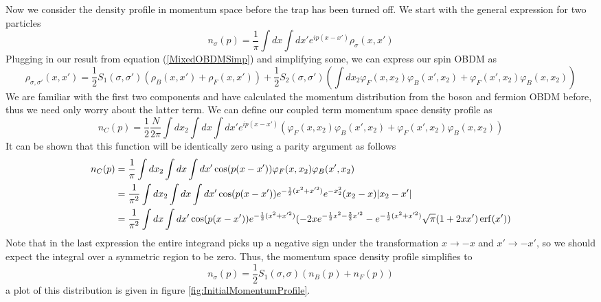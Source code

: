 \documentclass[onecolumn,english,aps,pra]{revtex4}
\begin{document}
Now we consider the density profile in momentum space before the trap has been turned off. We start with the general expression for two particles
\begin{equation}
n_{\sigma}(p) = \frac{1}{\pi} \int dx \int dx' e^{ip(x-x')} \rho_{\sigma}(x,x')
\end{equation}
Plugging in our result from equation (\ref{MixedOBDMSimp}) and simplifying some, we can express our spin OBDM as
\begin{equation}
\rho_{\sigma, \sigma'}(x,x') = \frac{1}{2}S_1(\sigma, \sigma')(\rho_B(x,x') + \rho_F(x,x')) + \frac{1}{2}S_2(\sigma, \sigma')(\int dx_2 \varphi_F(x,x_2)\varphi_B(x',x_2) + \varphi_F(x',x_2)\varphi_B(x,x_2))
\end{equation}
We are familiar with the first two components and have calculated the momentum distribution from the boson and fermion OBDM before, thus we need only worry about the latter term. We can define our coupled term momentum space density profile as 
\begin{equation}
n_C(p) = \frac{1}{2}\frac{N}{2\pi}\int dx_2  \int dx \int dx' e^{ip(x-x')}(\varphi_F(x,x_2)\varphi_B(x',x_2) + \varphi_F(x',x_2)\varphi_B(x,x_2))
\label{ncInitMom}
\end{equation}
It can be shown that this function will be identically zero using a parity argument as follows
\begin{align*}
n_C(p) & = \frac{1}{\pi}\int dx_2  \int dx \int dx' \cos(p(x-x'))\varphi_F(x,x_2)\varphi_B(x',x_2) \\
& = \frac{1}{\pi^2}\int dx_2  \int dx \int dx' \cos(p(x-x')) e^{-\frac{1}{2} (x^2 + x'^2)} e^{-x_2^2} (x_2 -x) |x_2 - x'|\\
& = \frac{1}{\pi^2} \int dx \int dx' \cos(p(x-x')) e^{-\frac{1}{2} (x^2 + x'^2)} 
(-2x e^{-\frac{1}{2}x^2 -\frac{3}{2}x'^2} - e^{-\frac{1}{2}(x^2 + x'^2)}\sqrt{\pi} (1+2xx')\erf(x'))
\end{align*}
Note that in the last expression the entire integrand picks up a negative sign under the transformation $x \rightarrow -x$ and $x' \rightarrow -x'$, so we should expect the integral over a symmetric region to be zero. Thus, the momentum space density profile simplifies to
\begin{equation}
n_{\sigma}(p) =  \frac{1}{2}S_1(\sigma, \sigma)(n_B(p) + n_F(p))
\end{equation}
a plot of this distribution is given in figure \ref{fig:InitialMomentumProfile}. 
\end{document}
